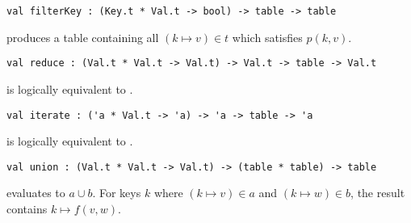 \begin{cluster}
\label{grp:grm:aug-ordtable-interface::filterkey}

\begin{gram}[filterKey]
\label{grm:aug-ordtable-interface::filterkey}
\begin{verbatim}
val filterKey : (Key.t * Val.t -> bool) -> table -> table
\end{verbatim}
 produces a table containing all $(k \mapsto v) \in t$ which
satisfies $p(k,v)$.

\end{gram}
\end{cluster}

\begin{cluster}
\label{grp:grm:aug-ordtable-interface::reduce}

\begin{gram}[reduce]
\label{grm:aug-ordtable-interface::reduce}
\begin{verbatim}
val reduce : (Val.t * Val.t -> Val.t) -> Val.t -> table -> Val.t
\end{verbatim}
 is logically equivalent to .

\end{gram}
\end{cluster}

\begin{cluster}
\label{grp:grm:aug-ordtable-interface::iterate}

\begin{gram}[iterate]
\label{grm:aug-ordtable-interface::iterate}
\begin{verbatim}
val iterate : ('a * Val.t -> 'a) -> 'a -> table -> 'a
\end{verbatim}
 is logically equivalent to .

\end{gram}
\end{cluster}

\begin{cluster}
\label{grp:grm:aug-ordtable-interface::union}

\begin{gram}[union]
\label{grm:aug-ordtable-interface::union}
\begin{verbatim}
val union : (Val.t * Val.t -> Val.t) -> (table * table) -> table
\end{verbatim}
 evaluates to $a \cup b$. For keys $k$ where $(k \mapsto v) \in a$
and $(k \mapsto w) \in b$, the result contains $k \mapsto f(v,w)$.

\end{gram}
\end{cluster}

